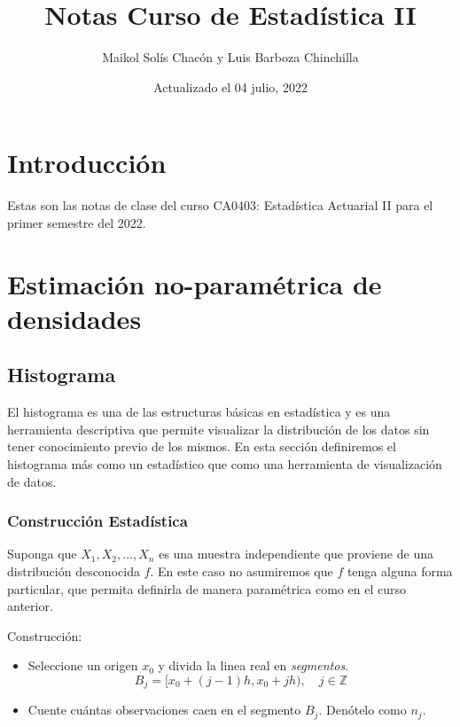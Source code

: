 \documentclass[
  12pt,
]{book}
\title{Notas Curso de Estadística II}
\author{Maikol Solís Chacón y Luis Barboza Chinchilla}
\date{Actualizado el 04 julio, 2022}
\theoremstyle{definition}
\theoremstyle{definition}
\theoremstyle{definition}
\theoremstyle{definition}
\theoremstyle{remark}
\begin{document}
\maketitle

{
\hypersetup{linkcolor=}
\setcounter{tocdepth}{4}
\tableofcontents
}
\hypertarget{introducciuxf3n}{%
\chapter{Introducción}\label{introducciuxf3n}}

Estas son las notas de clase del curso CA0403: Estadística Actuarial II para el primer semestre del 2022.

\hypertarget{estimaciuxf3n-no-paramuxe9trica-de-densidades}{%
\chapter{Estimación no-paramétrica de densidades}\label{estimaciuxf3n-no-paramuxe9trica-de-densidades}}

\hypertarget{histograma}{%
\section{Histograma}\label{histograma}}

El histograma es una de las estructuras básicas en estadística y es una herramienta descriptiva que permite visualizar la distribución de los datos sin tener conocimiento previo de los mismos. En esta sección definiremos el histograma más como un estadístico que como una herramienta de visualización de datos.

\hypertarget{construcciuxf3n-estaduxedstica}{%
\subsection{Construcción Estadística}\label{construcciuxf3n-estaduxedstica}}

Suponga que \(X_1,X_2, \dots ,X_n\) es una muestra independiente que proviene de una distribución desconocida \(f\). En este caso no asumiremos que \(f\) tenga alguna forma particular, que permita definirla de manera paramétrica como en el curso anterior.

Construcción:

\begin{itemize}
\item
  Seleccione un origen \(x_0\) y divida la linea real en \emph{segmentos}.
  \begin{equation*}
  B_j = [x_0 +(j - 1)h,x_0 + jh), \quad j\in \mathbb{Z}
  \end{equation*}
\item
  Cuente cuántas observaciones caen en el segmento \(B_j\). Denótelo como \(n_j\).
\end{itemize}
\end{document}
